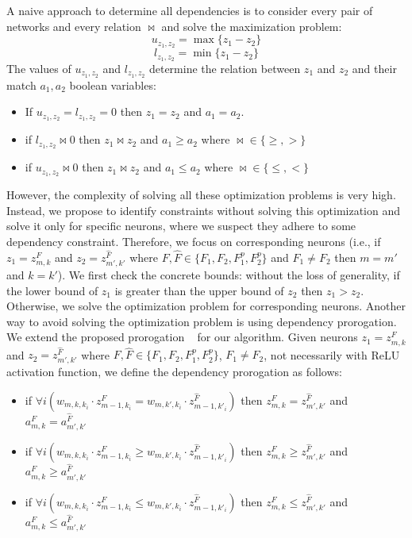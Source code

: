 A naive approach to determine all dependencies is to consider every pair of networks and every relation $\bowtie$ and solve the maximization problem:
$$ u_{z_1,z_2}=\max{\{z_1-z_2\}} $$
$$ l_{z_1,z_2}=\min{\{z_1-z_2\}} $$
The values of $u_{z_1,z_2}$ and $l_{z_1,z_2}$ determine the relation between $z_1$ and $z_2$ and their match $a_1,a_2$ boolean variables:
\begin{itemize}
    \item If $u_{z_1,z_2}=l_{z_1,z_2}=0$ then $z_1=z_2$ and $a_1=a_2$.
    \item if $l_{z_1,z_2}\bowtie{0}$ then $z_1\bowtie{z_2}$ and $a_1\ge{a_2}$ where $\bowtie\in{\{\ge,>\}}$
    \item if $u_{z_1,z_2}\bowtie{0}$ then $z_1\bowtie{z_2}$ and $a_1\le{a_2}$ where $\bowtie\in{\{\le,<\}}$
\end{itemize}
However, the complexity of solving all these optimization problems is very high.
Instead, we propose to identify constraints without solving this optimization and solve it only for specific neurons, where we suspect they adhere to some dependency constraint. 
Therefore, we focus on corresponding neurons (i.e., if $z_1=z^F_{m,k}$ and $z_2=z^{\hat{F}}_{m',k'}$ where $F,\hat{F}\in{\{F_1,F_2,F^p_1,F^p_2\}}$ and $F_1\neq{F_2}$ then $m=m'$ and $k=k'$). We first check the concrete bounds: without the loss of generality, if the lower bound of $z_1$ is greater than the upper bound of $z_2$ then $z_1>z_2$. Otherwise, we solve the optimization problem for corresponding neurons. Another way to avoid solving the optimization problem is using dependency prorogation. We extend the proposed prorogation ~\cite{VHAGAR} for our algorithm. Given neurons $z_1=z^F_{m,k}$ and $z_2=z^{\hat{F}}_{m',k'}$ where $F,\hat{F}\in{\{F_1,F_2,F^p_1,F^p_2\}}$, $F_1\neq{F_2}$, not necessarily with ReLU activation function, we define the dependency prorogation as follows:

\begin{itemize}
    \item if $\forall{i} (w_{m,k,k_i}\cdot{z^F_{m-1,k_i}}=w_{m,k',k_i}\cdot{z^{\hat{F}}_{m-1,k'_i}})$ then $z^F_{m,k}=z^{\hat{F}}_{m',k'}$ and $a^F_{m,k}=a^{\hat{F}}_{m',k'}$
    \item if $\forall{i} (w_{m,k,k_i}\cdot{z^F_{m-1,k_i}}\ge{w_{m,k',k_i}\cdot{z^{\hat{F}}_{m-1,k'_i}}})$ then $z^F_{m,k}\ge{z^{\hat{F}}_{m',k'}}$ and $a^F_{m,k}\ge{a^{\hat{F}}_{m',k'}}$
    \item if $\forall{i} (w_{m,k,k_i}\cdot{z^F_{m-1,k_i}}\le{w_{m,k',k_i}\cdot{z^{\hat{F}}_{m-1,k'_i}}})$ then $z^F_{m,k}\le{z^{\hat{F}}_{m',k'}}$ and $a^F_{m,k}\le{a^{\hat{F}}_{m',k'}}$
\end{itemize}

